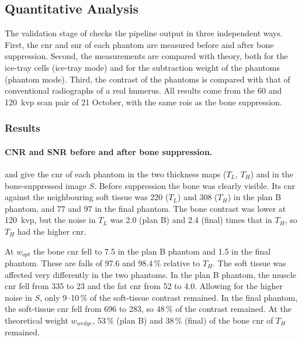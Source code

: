 \subsection{Quantitative Analysis}\label{subsec:analysis_results}

The validation stage of  checks the pipeline output in three independent ways. First, the \gls{cnr} and \gls{snr} of each phantom are measured before and after bone suppression. Second, the measurements are compared with theory, both for the ice-tray cells (ice-tray mode) and for the subtraction weight of the phantoms (phantom mode). Third, the contrast of the phantoms is compared with that of conventional radiographs of a real humerus. All results come from the 60 and 120~\gls{kvp} scan pair of 21 October, with the same \glspl{roi} as the bone suppression.

\subsubsection{Results}\label{subsubsec:analysis_results}

\paragraph{CNR and SNR before and after bone suppression.}  and  give the \gls{cnr} of each phantom in the two thickness maps ($T_L$, $T_H$) and in the bone-suppressed image $S$. Before suppression the bone was clearly visible. Its \gls{cnr} against the neighbouring soft tissue was 220 ($T_L$) and 308 ($T_H$) in the plan B phantom, and 77 and 97 in the final phantom. The bone contrast was lower at 120~\gls{kvp}, but the noise in $T_L$ was 2.0 (plan B) and 2.4 (final) times that in $T_H$, so $T_H$ had the higher \gls{cnr}.

At $w_{opt}$ the bone \gls{cnr} fell to 7.5 in the plan B phantom and 1.5 in the final phantom. These are falls of 97.6 and 98.4\,\% relative to $T_H$. The soft tissue was affected very differently in the two phantoms. In the plan B phantom, the muscle \gls{cnr} fell from 335 to 23 and the fat \gls{cnr} from 52 to 4.0. Allowing for the higher noise in $S$, only 9--10\,\% of the soft-tissue contrast remained. In the final phantom, the soft-tissue \gls{cnr} fell from 696 to 283, so 48\,\% of the contrast remained. At the theoretical weight $w_{wedge}$, 53\,\% (plan B) and 38\,\% (final) of the bone \gls{cnr} of $T_H$ remained.

